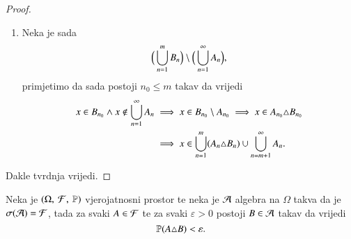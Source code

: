 \begin{rj}[\ref{zad:9.10}]
\begin{proof}
\begin{enumerate}[label=(\roman*)]
            \item
            Neka je sada 
            \begin{equation*}
                \Big( \bigcup\limits_{n = 1}^{m} B_n \Big) \setminus \Big( \bigcup\limits_{n = 1}^{\infty} A_n \Big),
            \end{equation*}
            primjetimo da sada postoji $n_0 \leq m$ takav da vrijedi
            \begin{equation*}
                \begin{aligned}
                    x \in B_{n_0} \land x \notin \bigcup\limits_{n = 1}^{\infty} A_n &\implies x \in B_{n_0} \setminus A_{n_0} \implies x \in A_{n_0} \triangle B_{n_0}\\
                    &\implies x \in \bigcup\limits_{n = 1}^{m} (A_n \triangle B_n) \cup \bigcup\limits_{n = m + 1}^{\infty} A_n.
                \end{aligned}
            \end{equation*}
        \end{enumerate}
        Dakle tvrdnja vrijedi.
    \end{proof}

    \begin{lm}  \label{lm:9.10-2}
        Neka je $(\Omega, \: \mathcal{F}, \: \mathbb{P})$ vjerojatnosni prostor te neka je $\mathcal{A}$ algebra na $\Omega$ takva da je $\sigma({\mathcal{A}}) = \mathcal{F}$, tada za svaki $A \in \mathcal{F}$ te za svaki $\varepsilon > 0$ postoji $B \in \mathcal{A}$ takav da vrijedi
        \begin{equation*}
            \mathbb{P} (A \triangle B) < \varepsilon.
        \end{equation*}
    \end{lm}


\end{rj}
